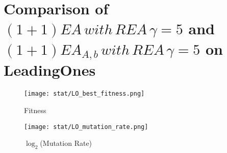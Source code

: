 \documentclass{article}
\begin{document}
%
%
%

\section{Comparison of $(1+1)EA\,with\,REA\,\gamma=5$ and $(1+1)EA_{A,b}\,with\,REA\,\gamma=5$ on LeadingOnes}

\begin{figure}[H]
  \texttt{[image: stat/LO\_best\_fitness.png]}
  \caption{Fitness}
\end{figure}
\begin{figure}[H]
  \texttt{[image: stat/LO\_mutation\_rate.png]}
  \caption{$\log_2$(Mutation Rate)}
\end{figure}
\end{document}
